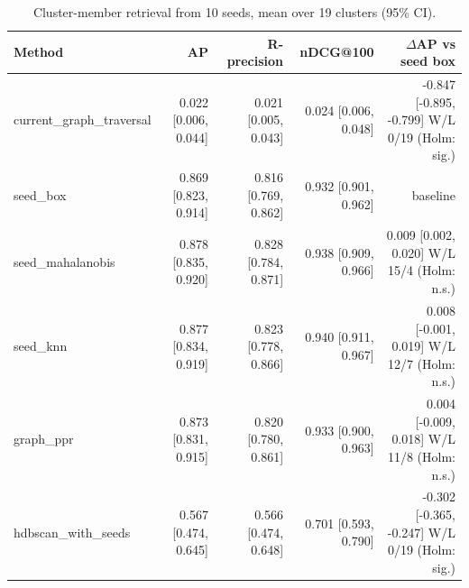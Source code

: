 \begin{table}[htbp]\centering\small
\caption{Cluster-member retrieval from 10 seeds, mean over 19 clusters (95\% CI).}\label{tab:retrieval}
\begin{tabular}{lrrrr}
\toprule
Method & AP & R-precision & nDCG@100 & $\Delta$AP vs seed box \\
\midrule
current\_graph\_traversal & 0.022 [0.006, 0.044] & 0.021 [0.005, 0.043] & 0.024 [0.006, 0.048] & -0.847 [-0.895, -0.799] W/L 0/19 (Holm: sig.) \\
seed\_box & 0.869 [0.823, 0.914] & 0.816 [0.769, 0.862] & 0.932 [0.901, 0.962] & baseline \\
seed\_mahalanobis & 0.878 [0.835, 0.920] & 0.828 [0.784, 0.871] & 0.938 [0.909, 0.966] & 0.009 [0.002, 0.020] W/L 15/4 (Holm: n.s.) \\
seed\_knn & 0.877 [0.834, 0.919] & 0.823 [0.778, 0.866] & 0.940 [0.911, 0.967] & 0.008 [-0.001, 0.019] W/L 12/7 (Holm: n.s.) \\
graph\_ppr & 0.873 [0.831, 0.915] & 0.820 [0.780, 0.861] & 0.933 [0.900, 0.963] & 0.004 [-0.009, 0.018] W/L 11/8 (Holm: n.s.) \\
hdbscan\_with\_seeds & 0.567 [0.474, 0.645] & 0.566 [0.474, 0.648] & 0.701 [0.593, 0.790] & -0.302 [-0.365, -0.247] W/L 0/19 (Holm: sig.) \\
\bottomrule
\end{tabular}
\end{table}
